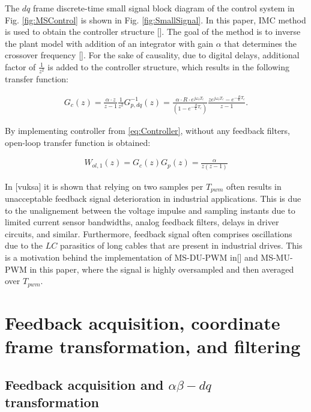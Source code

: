 \documentclass[journal]{IEEEtran}
\begin{document}
The $dq$ frame discrete-time small signal block diagram of the control system in Fig. \ref{fig:MSControl} is shown in Fig. \ref{fig:SmallSignal}. In this paper, IMC method is used to obtain the controller structure []. The goal of the method is to inverse the plant model with addition of an integrator with gain $\alpha$ that determines the crossover frequency []. For the sake of causality, due to digital delays, additional factor of $\frac{1}{z^2}$ is added to the controller structure, which results in the following transfer function:

\begin{equation}
\begin{aligned}
G_{c}(z) =  \frac{\alpha \cdot z}{z-1} \frac{1}{z^2} G^{-1}_{p,dq}(z)  =   \frac{\alpha \cdot R \cdot e^{j\omega_o T_c}}{\left( 1 - e^{-\frac{R}{L}T_c}\right)}\frac{z e^{j\omega_o T_c}-e^{-\frac{R}{L}T_c}}{z-1}.
\label{eq:Controller} 
\end{aligned}    
\end{equation}

By implementing controller from \eqref{eq:Controller}, without any feedback filters, open-loop transfer function is obtained:

\begin{equation}
\begin{aligned}
W_{ol,1}(z) = G_c(z) G_p(z) =  \frac{\alpha}{z(z-1)}
\label{eq:OpenLoop} 
\end{aligned}    
\end{equation}

In [vuksa] it is shown that relying on two samples per $T_{pwm}$ often results in unacceptable feedback signal deterioration in industrial applications. This is due to the unalignement between the voltage impulse and sampling instants due to limited current sensor bandwidths, analog feedback filters, delays in driver circuits, and similar. Furthermore, feedback signal often comprises oscillations due to the $LC$ parasitics of long cables that are present in industrial drives. This is a motivation behind the implementation of MS-DU-PWM in[] and MS-MU-PWM in this paper, where the signal is highly oversampled and then averaged over $T_{pwm}$.

\section{Feedback acquisition, coordinate frame transformation, and filtering}

\subsection{Feedback acquisition and $\alpha \beta - dq$ transformation}
\end{document}
